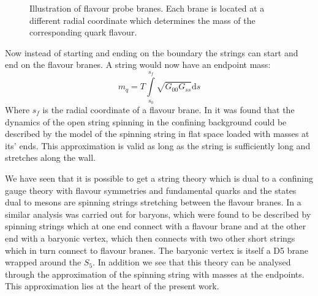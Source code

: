 \documentclass[11pt,a4paper]{article}
\begin{document}
\begin{figure}
\centering
{}
\caption{Illustration of flavour probe branes. Each brane is located at a different radial coordinate which determines the mass of the corresponding quark flavour.}
\end{figure}

Now instead of starting and ending on the boundary the strings can start and end on the flavour branes. A string would now have an endpoint mass:
\begin{equation}
m_q=	T\int\limits_{s_0}^{s_f} \sqrt{G_{00}G_{ss}}\mathrm{d}s
\end{equation}
Where $s_f$ is the radial coordinate of a flavour brane. In \cite{Kruczenski05} it was found that the dynamics of the open string spinning in the confining background could be described by the model of the spinning string in flat space loaded with masses at its' ends. This approximation is valid as long as the string is sufficiently long and stretches along the wall.

We have seen that it is possible to get a string theory which is dual to a confining gauge theory with flavour symmetries and fundamental quarks and the states dual to mesons are spinning strings stretching between the flavour branes. In \cite{Seki08} a similar analysis was carried out for baryons, which were found to be described by spinning strings which at one end connect with a flavour brane and at the other end with a baryonic vertex, which then connects with two other short strings which in turn connect to flavour branes. The baryonic vertex is itself a D5 brane wrapped around the $S_5$. In addition we see that this theory can be analysed through the approximation of the spinning string with masses at the endpoints. This approximation lies at the heart of the present work.
\end{document}
